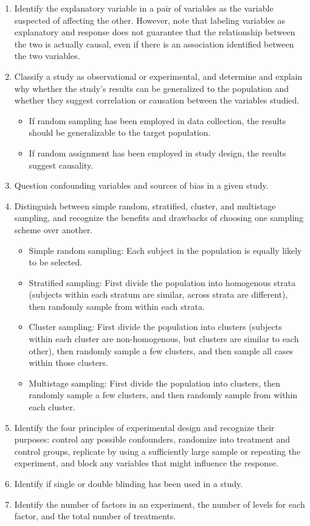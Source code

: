 \documentclass[11pt]{article}
\begin{document}
\begin{enumerate}[resume]
\renewcommand\labelenumi{\textcolor{light}{\textbf{LO \theenumi.}}}
\item Identify the explanatory variable in a pair of variables as the variable suspected of affecting the other. However, note that labeling variables as explanatory and response does not guarantee that the relationship between the two is actually causal, even if there is an association identified between the two variables. 
\item Classify a study as observational or experimental, and determine and explain why whether the study's results can be generalized to the population and whether they suggest correlation or causation between the variables studied.
\begin{itemize}
\renewcommand{\labelitemi}{{\textcolor{dark}{{\tiny $\blacksquare$}}}}
\item If random sampling has been employed in data collection, the results should be generalizable to the target population.
\item If random assignment has been employed in study design, the results suggest causality.
\end{itemize}
\item Question confounding variables and sources of bias in a given study.
\item Distinguish between simple random, stratified, cluster, and multistage sampling, and recognize the benefits and drawbacks of choosing one sampling scheme over another.
\begin{itemize}
\renewcommand{\labelitemi}{{\textcolor{dark}{{\tiny $\blacksquare$}}}}
\item Simple random sampling: Each subject in the population is equally likely to be selected.
\item Stratified sampling: First divide the population into homogenous strata (subjects within each stratum are similar, across strata are different), then randomly sample from within each strata.
\item Cluster sampling: First divide the population into clusters (subjects within each cluster are non-homogenous, but clusters are similar to each other), then randomly sample a few clusters, and then sample all cases within those clusters. 
\item Multistage sampling: First divide the population into clusters, then randomly sample a few clusters, and then randomly sample from within each cluster. 
\end{itemize}
\item Identify the four principles of experimental design and recognize their purposes: control any possible confounders, randomize into treatment and control groups, replicate by using a sufficiently large sample or repeating the experiment, and block any variables that might influence the response.
\item Identify if single or double blinding has been used in a study.
\item Identify the number of factors in an experiment, the number of levels for each factor, and the total number of treatments.
\end{enumerate}
\end{document}
